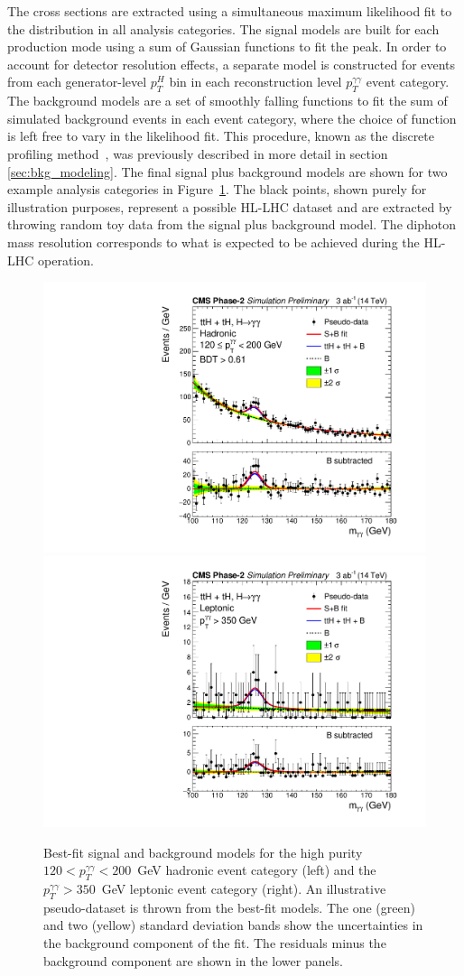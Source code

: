 The cross sections are extracted using a simultaneous maximum likelihood fit to the \mgg distribution in all analysis categories. The signal models are built for each production mode using a sum of Gaussian functions to fit the \mgg peak. In order to account for detector resolution effects, a separate model is constructed for events from each generator-level $p_T^H$ bin in each reconstruction level $p_T^{\gamma\gamma}$ event category. The background models are a set of smoothly falling functions to fit the sum of simulated background events in each event category, where the choice of function is left free to vary in the likelihood fit. This procedure, known as the discrete profiling method~\cite{Dauncey:2014xga}, was previously described in more detail in section \ref{sec:bkg_modeling}. The final signal plus background models are shown for two example analysis categories in Figure~\ref{fig:trilinear_mgg}. The black points, shown purely for illustration purposes, represent a possible HL-LHC dataset and are extracted by throwing random toy data from the signal plus background model. The diphoton mass resolution corresponds to what is expected to be achieved during the HL-LHC operation.

\begin{figure}[htb!]
  \centering
  \includegraphics[width=.49\textwidth]{Figures/cms/trilinear/CMS-PAS-FTR-18-020_Figure_004-a.pdf}
  \includegraphics[width=.49\textwidth]{Figures/cms/trilinear/CMS-PAS-FTR-18-020_Figure_005-f.pdf}
  \caption[Diphoton mass distributions for two event categories in the HL-LHC sensitivity study]
  {
     Best-fit signal and background models for the high purity $120<p_T^{\gamma\gamma}<200$~GeV hadronic event category (left) and the $p_T^{\gamma\gamma}>350$~GeV leptonic event category (right). An illustrative pseudo-dataset is thrown from the best-fit models. The one (green) and two (yellow) standard deviation bands show the uncertainties in the background component of the fit. The residuals minus the background component are shown in the lower panels.
  }
  \label{fig:trilinear_mgg}
\end{figure}

